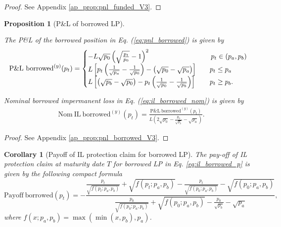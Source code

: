 \documentclass[pdftex,11pt,a4paper] {article}
\newtheorem{corollary}{Corollary}[section]
\newtheorem{proposition}{Proposition}[section]
\begin{document}
\begin{proof}
See Appendix \ref{ap_prop:pnl_funded_V3}.
\end{proof}

\begin{proposition}[P\&L of borrowed LP]
\label{prop:pnl_borrowed_V3}

The P\&L of the borrowed position in Eq. (\ref{eq:pnl_borrowed}) is given by
\begin{equation}  \label{eq:pnl_borrowed_V3}
\mathrm{P\&L\ borrowed}^{(y)}(p_{t}) =
\begin{cases}
- L \sqrt{p_{0}} \left(\sqrt{\frac{p_{t}}{p_{0}}}-1\right)^{2} \quad & \,
p_{t} \in (p_{a}, p_{b}) \\
L \left[ p_{t} \left(\frac{1}{\sqrt{p_{a}}} - \frac{1}{\sqrt{p_{0}}}\right)
- \left(\sqrt{p_{0}} - \sqrt{p_{a}}\right) \right] \quad & p_{t} \leq p_{a}
\\
L\left[ \left(\sqrt{p_{b}} - \sqrt{p_{0}}\right)- p_{t} \left(\frac{1}{\sqrt{%
p_{0}}} - \frac{1}{\sqrt{p_{b}}}\right) \right] \quad & p_{t} \geq p_{b}.
\end{cases}%
\end{equation}

Nominal borrowed impermanent loss in Eq. (\ref{eq:il_borrowed_nom}) is given
by
\begin{equation}  \label{eq:il_borrowed_nom_V3}
\begin{split}
&\mathrm{Nom \ IL \ borrowed}^{(y)}(p_{t}) = \frac{\mathrm{P\&L \ borrowed}^{(y)}(p_{t})}{L
\left( 2\sqrt{p_{0}} - \frac{p_{0}}{\sqrt{p_{b}}} - \sqrt{p_{a}} \right)}.
\end{split}%
\end{equation}
\end{proposition}

\begin{proof}
See Appendix \ref{ap_prop:pnl_borrowed_V3}.
\end{proof}

\begin{corollary}[Payoff of IL protection claim for borrowed LP]
The pay-off of IL protection claim at maturity date $T$ for borrowed LP in Eq. %
\eqref{eq:il_borrowed_p} is given by the following compact formula
\begin{equation}  \label{eq:il_borrowed_nom_V3a}
\mathrm{ Payoff \ borrowed}(p_{t}) = - \frac{ \frac{p_{t}}{\sqrt{f(p_{t}; p_{a}, p_{b})}}
+\sqrt{f(p_{t}; p_{a}, p_{b})} - \frac{p_{t}}{\sqrt{f(p_{0}; p_{a}, p_{b})}}
-\sqrt{f(p_{0}; p_{a}, p_{b})}} { \frac{p_{0}}{\sqrt{f(p_{0}; p_{a}, p_{b})}}
+\sqrt{f(p_{0}; p_{a}, p_{b})} - \frac{p_{0}}{\sqrt{p_{b}}} -\sqrt{p_{a}} },
\end{equation}
where $f(x; p_{a}, p_{b})=\max\left(\min\left(x, p_{b}\right), p_{a}\right)$.
\end{corollary}
\end{document}

